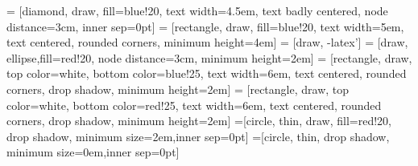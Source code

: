 \tableofcontents

\forceindent %



  = [diamond, draw, fill=blue!20, text width=4.5em, text badly centered, node distance=3cm, inner sep=0pt]
 = [rectangle, draw, fill=blue!20, text width=5em, text centered, rounded corners, minimum height=4em]
  = [draw, -latex']
  = [draw, ellipse,fill=red!20, node distance=3cm, minimum height=2em]
  = [rectangle, draw, top color=white, bottom color=blue!25, 
    text width=6em, text centered, rounded corners, drop shadow, minimum height=2em]
  = [rectangle, draw, top color=white, bottom color=red!25,
    text width=6em, text centered, rounded corners, drop shadow, minimum height=2em]
 =[circle, thin, draw, fill=red!20, drop shadow, minimum size=2em,inner sep=0pt]
=[circle, thin, drop shadow, minimum size=0em,inner sep=0pt]


